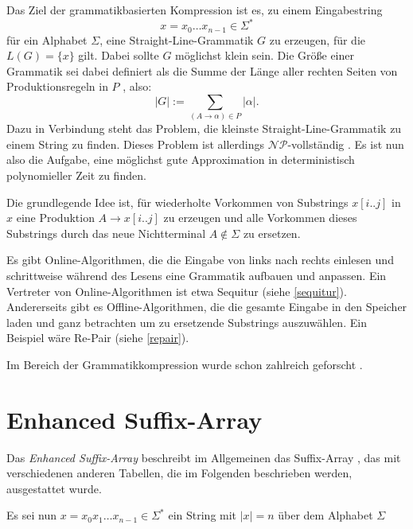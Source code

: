 Das Ziel der grammatikbasierten Kompression ist es, zu einem Eingabestring 
\begin{equation*}
	x = x_0 \dots x_{n-1} \in \Sigma^*
\end{equation*}
für ein Alphabet $\Sigma$, eine Straight-Line-Grammatik $G$ zu erzeugen, für die $L(G) = \{x\}$ gilt. Dabei sollte $G$ möglichst klein sein. Die Größe einer Grammatik sei dabei definiert als die Summe der Länge aller rechten Seiten von Produktionsregeln in $P$ \cite{charikar_smallest_2005}, also:
\begin{equation*}
	|G| := \sum_{(A \rightarrow \alpha) \in P} |\alpha|.
\end{equation*}
Dazu in Verbindung steht das Problem, die kleinste Straight-Line-Grammatik zu einem String zu finden. 
Dieses Problem ist allerdings $\mathcal{NP}$-vollständig \cite{charikar_smallest_2005}. Es ist nun also die Aufgabe, eine möglichst gute Approximation in deterministisch polynomieller Zeit zu finden.

Die grundlegende Idee ist, für wiederholte Vorkommen von Substrings $x[i..j]$ in $x$ eine Produktion $A \rightarrow x[i..j]$ zu erzeugen und alle Vorkommen dieses Substrings durch das neue Nichtterminal $A \notin \Sigma$ zu ersetzen.

Es gibt Online-Algorithmen, die die Eingabe von links nach rechts einlesen und schrittweise während des Lesens eine Grammatik aufbauen und anpassen. Ein Vertreter von Online-Algorithmen ist etwa Sequitur \cite{nevill-manning_identifying_1997} (siehe \autoref{sequitur}). 
Andererseits gibt es Offline-Algorithmen, die die gesamte Eingabe in den Speicher laden und ganz betrachten um zu ersetzende Substrings auszuwählen. Ein Beispiel wäre Re-Pair \cite{larsson_offline_1999} (siehe \autoref{repair}).

Im Bereich der Grammatikkompression wurde schon zahlreich geforscht \cite{benz_effective_2013, carrascosa_choosing_2010, charikar_smallest_2005}. 

\section{Enhanced Suffix-Array}

Das \emph{Enhanced Suffix-Array} \cite{abouelhoda_replacing_2004} beschreibt im Allgemeinen das Suffix-Array \cite{manber_suffix_1993}, das mit verschiedenen anderen Tabellen, die im Folgenden beschrieben werden, ausgestattet wurde.

Es sei nun $x = x_0 x_1 \dots x_{n-1}\in \Sigma^*$ ein String mit $|x| = n$ über dem Alphabet $\Sigma$ 


